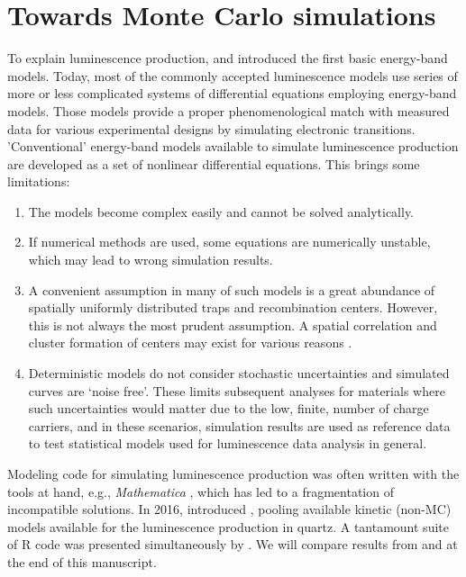 \hypertarget{towards-monte-carlo-simulations}{%
\section{Towards Monte Carlo
simulations}\label{towards-monte-carlo-simulations}}

To explain luminescence production, \citet{Johnson:1939iy} and
\citet{Randall:1945je} introduced the first basic energy-band models. Today,
most of the commonly accepted luminescence models use series of more or
less complicated systems of differential equations \citep[for an
overview, see][]{Chen:1997dr, Botter-Jensen_2003uq, Chen_2011ij}
employing energy-band models. Those models provide a proper
phenomenological match with measured data for various experimental
designs by simulating electronic transitions. 'Conventional' energy-band
models available to simulate luminescence production are developed as a
set of nonlinear differential equations. This brings some limitations:

\begin{enumerate}
\def\labelenumi{\arabic{enumi}.}
\tightlist
\item
  The models become complex easily and cannot be solved analytically.
\item
  If numerical methods are used, some equations are numerically
  unstable, which may lead to wrong simulation results.
\item
  A convenient assumption in many of such models is a great abundance of
  spatially uniformly distributed traps and recombination centers.
  However, this is not always the most prudent assumption. A spatial
  correlation and cluster formation of centers may exist for various
  reasons \citep[cf.][]{Mandowski:1992ke, Chen_2011ij, Horowitz:2017eo}.
\item
  Deterministic models do not consider stochastic uncertainties and
  simulated curves are `noise free'. These limits subsequent analyses for
  materials where such uncertainties would matter due to the low,
  finite, number of charge carriers, and in these scenarios, simulation
  results are used as reference data to test statistical models used for
  luminescence data analysis in general.
\end{enumerate}

Modeling code for simulating luminescence production was often written
with the tools at hand, e.g., \emph{Mathematica}
\citep[e.g.,][]{Pagonis_2006ve}, which has led to a fragmentation of
incompatible solutions. In 2016, \citet{Friedrich:2016kia} introduced
 \citep{RLumModel}, pooling available kinetic (non-MC)
models available for the luminescence production in quartz. A tantamount
suite of R code was presented simultaneously by \citet{Peng:2016jg}. We
will compare results from  and  at
the end of this manuscript.

